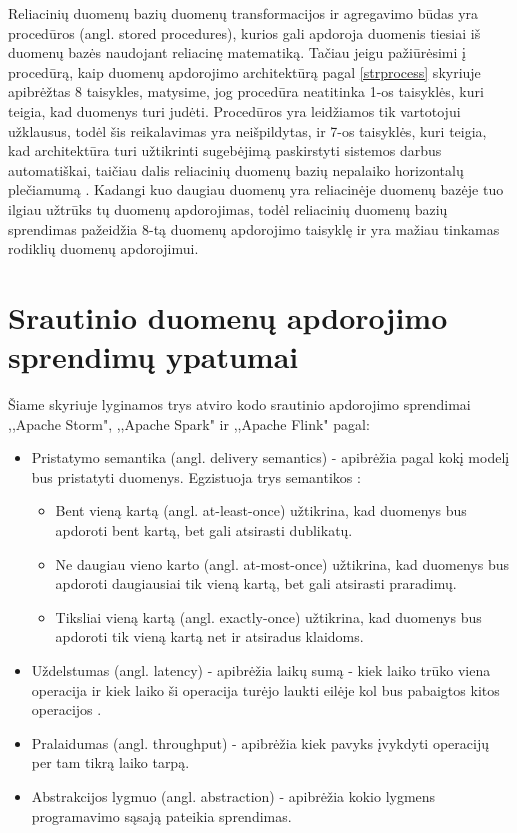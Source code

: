 \documentclass{VUMIFPSkursinis}
\begin{document}
        Reliacinių duomenų bazių duomenų transformacijos ir agregavimo būdas yra procedūros (angl. stored procedures), kurios gali apdoroja duomenis tiesiai iš duomenų bazės 
    naudojant reliacinę matematiką. Tačiau jeigu pažiūrėsimi į procedūrą, kaip duomenų apdorojimo architektūrą pagal \ref{strprocess} skyriuje apibrėžtas 8 taisykles, 
    matysime, jog procedūra neatitinka 1-os taisyklės, kuri teigia, kad duomenys turi judėti. Procedūros yra leidžiamos tik vartotojui užklausus, todėl šis reikalavimas yra neišpildytas, 
    ir 7-os taisyklės, kuri teigia, kad architektūra turi užtikrinti sugebėjimą paskirstyti sistemos darbus automatiškai, taičiau dalis reliacinių duomenų bazių nepalaiko horizontalų 
    plečiamumą \cite{cattelsql, jkubas}. Kadangi kuo daugiau duomenų yra reliacinėje duomenų bazėje 
    tuo ilgiau užtrūks tų duomenų apdorojimas, todėl reliacinių duomenų bazių sprendimas pažeidžia 8-tą duomenų 
    apdorojimo taisyklę ir yra mažiau tinkamas rodiklių duomenų apdorojimui.


\section{Srautinio duomenų apdorojimo sprendimų ypatumai} \label{srautarch}
Šiame skyriuje lyginamos trys atviro kodo srautinio apdorojimo sprendimai ,,Apache Storm", ,,Apache Spark" ir ,,Apache Flink" pagal:
\begin{itemize}
    \item Pristatymo semantika (angl. delivery semantics) - apibrėžia pagal kokį modelį bus pristatyti duomenys. Egzistuoja trys semantikos \cite{ensar20}: 
    \begin{itemize}
        \item Bent vieną kartą (angl. at-least-once) užtikrina, kad duomenys bus apdoroti bent kartą, bet gali atsirasti dublikatų. 
        \item Ne daugiau vieno karto (angl. at-most-once) užtikrina, kad duomenys bus apdoroti daugiausiai tik vieną kartą, bet gali atsirasti praradimų. 
        \item Tiksliai vieną kartą (angl. exactly-once) užtikrina, kad duomenys bus apdoroti tik vieną kartą net ir atsiradus klaidoms.
    \end{itemize}
    \item Uždelstumas (angl. latency) - apibrėžia laikų sumą - kiek laiko trūko viena operacija ir kiek laiko ši operacija turėjo laukti eilėje
    kol bus pabaigtos kitos operacijos \cite{karimov2018benchmarking}.
    \item Pralaidumas (angl. throughput) - apibrėžia kiek pavyks įvykdyti operacijų per tam tikrą laiko tarpą.
    \item Abstrakcijos lygmuo (angl. abstraction) - apibrėžia kokio lygmens programavimo sąsają pateikia sprendimas.
\end{itemize}
\end{document}
